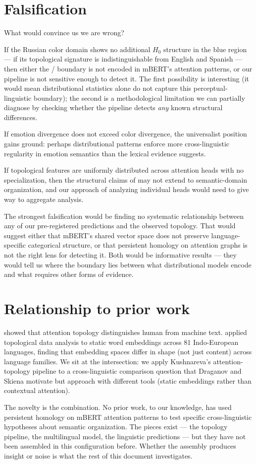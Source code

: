 \section{Falsification}

What would convince us we are wrong?

If the Russian color domain shows no additional $H_0$ structure in the blue region --- if its topological signature is indistinguishable from English and Spanish --- then either the / boundary is not encoded in mBERT's attention patterns, or our pipeline is not sensitive enough to detect it. The first possibility is interesting (it would mean distributional statistics alone do not capture this perceptual-linguistic boundary); the second is a methodological limitation we can partially diagnose by checking whether the pipeline detects \emph{any} known structural differences.

If emotion divergence does not exceed color divergence, the universalist position gains ground: perhaps distributional patterns enforce more cross-linguistic regularity in emotion semantics than the lexical evidence suggests.

If topological features are uniformly distributed across attention heads with no specialization, then the structural claims of \textcite{clark2019} may not extend to semantic-domain organization, and our approach of analyzing individual heads would need to give way to aggregate analysis.

The strongest falsification would be finding no systematic relationship between any of our pre-registered predictions and the observed topology. That would suggest either that mBERT's shared vector space does not preserve language-specific categorical structure, or that persistent homology on attention graphs is not the right lens for detecting it. Both would be informative results --- they would tell us where the boundary lies between what distributional models encode and what requires other forms of evidence.

\section{Relationship to prior work}

\textcite{kushnareva2021} showed that attention topology distinguishes human from machine text. \textcite{draganov2024} applied topological data analysis to static word embeddings across 81 Indo-European languages, finding that embedding spaces differ in shape (not just content) across language families. We sit at the intersection: we apply Kushnareva's attention-topology pipeline to a cross-linguistic comparison question that Draganov and Skiena motivate but approach with different tools (static embeddings rather than contextual attention).

The novelty is the combination. No prior work, to our knowledge, has used persistent homology on mBERT attention patterns to test specific cross-linguistic hypotheses about semantic organization. The pieces exist --- the topology pipeline, the multilingual model, the linguistic predictions --- but they have not been assembled in this configuration before. Whether the assembly produces insight or noise is what the rest of this document investigates.
